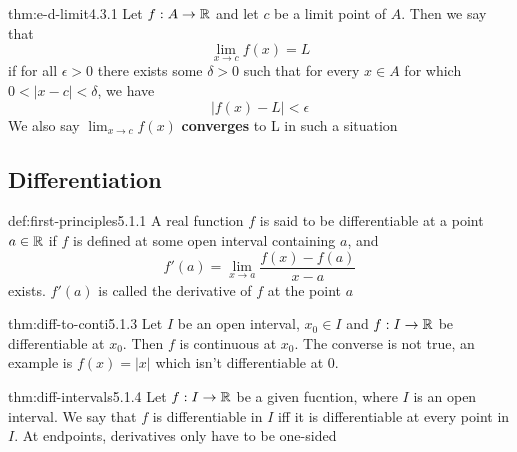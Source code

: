 \documentclass[landscape, 8pt]{extarticle}
\begin{document}
\begin{multicols}{3}
\begin{thm}{thm:e-d-limit}{4.3.1}
    Let $f:A\to\mathbb{R}$ and let $c$ be a limit point of $A$. Then we say that
    \[\displaystyle\lim_{x \to c} f(x) = L\]
    if for all $\epsilon>0$ there exists some $\delta>0$ such that for every $x\in A$ for which $0<\lvert x-c \rvert<\delta$, we have
    \[\lvert f(x)-L \rvert<\epsilon \]
    We also say $\displaystyle\lim_{x \to c}f(x)$ \textbf{converges} to L in such a situation
\end{thm}
\vspace{-5pt}


\subsection*{Differentiation}
\begin{dfn}{def:first-principles}{5.1.1}
A real function $f$ is said to be differentiable at a point $a\in \mathbb{R}$ if $f$ is defined at some open interval containing $a$, and
\[f'(a) = \lim_{x\to a} \frac{f(x) - f(a)}{x - a}\]
exists. $f'(a)$ is called the derivative of $f$ at the point $a$
\end{dfn}
\vspace{-5pt}


\begin{thm}{thm:diff-to-conti}{5.1.3}
    Let $I$ be an open interval, $x_{0}\in I$ and $f:I\to \mathbb{R}$ be differentiable at $x_{0}$. Then $f$ is continuous at $x_{0}$. The converse is not true, an example is $f(x)=\lvert x\rvert $ which isn't differentiable at $0$.
\end{thm}
\vspace{-5pt}

\begin{thm}{thm:diff-intervals}{5.1.4}
    Let $f:I\to \mathbb{R}$ be a given fucntion, where $I$ is an open interval. We say that $f$ is differentiable in $I$ iff it is differentiable at every point in $I$.
    At endpoints, derivatives only have to be one-sided
\end{thm}
\vspace{-5pt}


\end{multicols}
\end{document}

